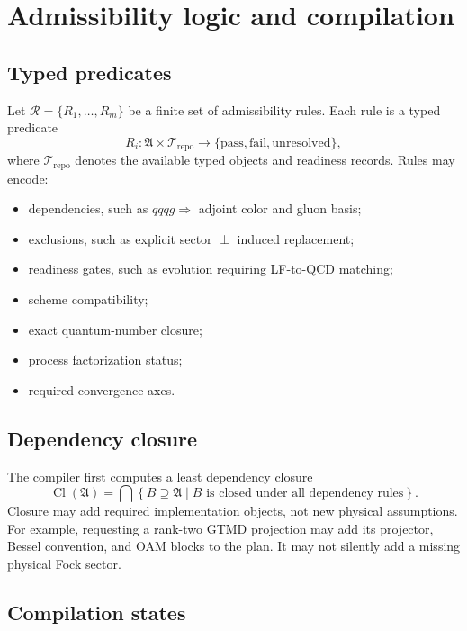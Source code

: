\documentclass[11pt]{article}
\newcommand{\cR}{\mathcal R}
\newcommand{\cT}{\mathcal T}
\newcommand{\Aset}{\mathfrak A}
\begin{document}
\section{Admissibility logic and compilation}
\label{sec:compiler}

\subsection{Typed predicates}

Let \(\cR=\{R_1,\ldots,R_m\}\) be a finite set of admissibility rules.  Each
rule is a typed predicate
\begin{equation}
 R_i:\Aset\times\cT_{\mathrm{repo}}
 \longrightarrow
 \{\mathrm{pass},\mathrm{fail},\mathrm{unresolved}\},
\label{eq:typed-rule}
\end{equation}
where \(\cT_{\mathrm{repo}}\) denotes the available typed objects and
readiness records.  Rules may encode:
\begin{itemize}
 \item dependencies, such as \(qqqg\Rightarrow\) adjoint color and gluon basis;
 \item exclusions, such as explicit sector \(\perp\) induced replacement;
 \item readiness gates, such as evolution requiring LF-to-QCD matching;
 \item scheme compatibility;
 \item exact quantum-number closure;
 \item process factorization status;
 \item required convergence axes.
\end{itemize}

\subsection{Dependency closure}

The compiler first computes a least dependency closure
\begin{equation}
 \operatorname{Cl}(\Aset)
 =
 \bigcap
 \left\{
 B\supseteq\Aset\mid
 B\text{ is closed under all dependency rules}
 \right\}.
\label{eq:dependency-closure}
\end{equation}
Closure may add required implementation objects, not new physical assumptions.
For example, requesting a rank-two GTMD projection may add its projector,
Bessel convention, and OAM blocks to the plan.  It may not silently add a
missing physical Fock sector.

\subsection{Compilation states}
\end{document}
